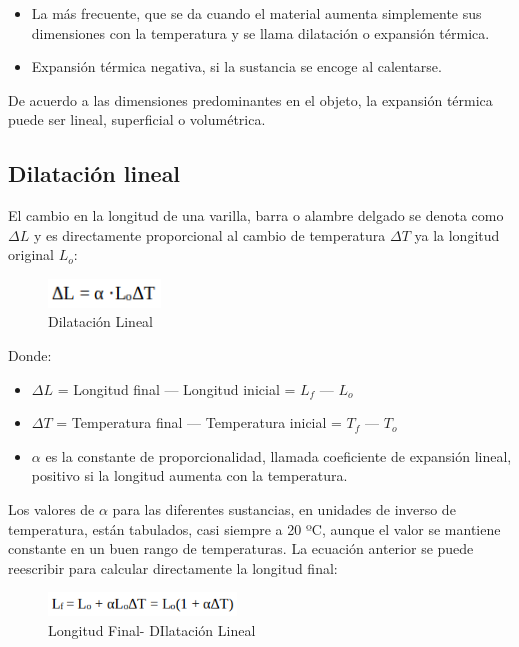 \documentclass[journal,transmag]{IEEEtran}
\begin{document}
 \begin{itemize}
    \item La más frecuente, que se da cuando el material aumenta simplemente sus dimensiones con la temperatura y se llama dilatación o expansión térmica.    
    \item Expansión térmica negativa, si la sustancia se encoge al calentarse.
\end{itemize}
	
	De acuerdo a las dimensiones predominantes en el objeto, la expansión térmica puede ser lineal, superficial o volumétrica.
	
 \subsection{Dilatación lineal}
El cambio en la longitud de una varilla, barra o alambre delgado se denota como $\Delta L$ y es directamente proporcional al cambio de temperatura $\Delta T$ ya la longitud original $L_{o}$:

\begin{figure}[!h]
		\center
		\includegraphics[width=3cm]{eq1.png}
		\caption{Dilatación Lineal}
		\label{1}
		\end{figure}
		
	Donde:
	
\begin{itemize}
    \item $\Delta L$ = Longitud final — Longitud inicial = $L_{f}$ — $L_{o}$
    \item $\Delta T$ = Temperatura final — Temperatura inicial = $T_{f}$ — $T_{o}$
    \item $\alpha$ es la constante de proporcionalidad, llamada coeficiente de 	expansión lineal, positivo si la longitud aumenta con la temperatura.
\end{itemize}
	
	Los valores de $\alpha$ para las diferentes sustancias, en unidades de inverso de temperatura, están tabulados, casi siempre a 20 ºC, aunque el valor se mantiene constante en un buen rango de temperaturas.
La ecuación anterior se puede reescribir para calcular directamente la longitud final:
	
	\begin{figure}[!h]
		\center
		\includegraphics[width=5cm]{eq2.png}
		\caption{Longitud Final- DIlatación Lineal}
		\label{2}
		\end{figure}
		
\end{document}
